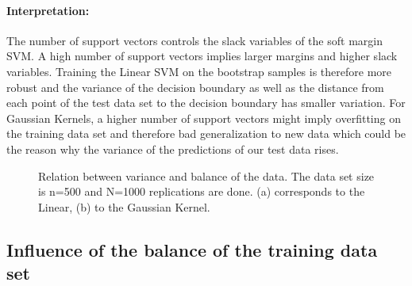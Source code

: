 \documentclass[a4paper]{article}
\begin{document}
\paragraph{Interpretation:}
The number of support vectors controls the slack variables of the soft margin SVM. A high number of support vectors implies larger margins and higher slack variables. Training the Linear SVM on the bootstrap samples is therefore more robust and the variance of the decision boundary as well as the distance from each point of the test data set to the decision boundary has smaller variation.
For Gaussian Kernels, a higher number of support vectors might imply overfitting on the training data set and therefore bad generalization to new data which could be the reason why the variance of the predictions of our test data rises.

\begin{figure}[!htb]
\begin{center}

\caption{Relation between variance and balance of the data. The data set size is n=500 and N=1000 replications are done. (a) corresponds to the Linear, (b) to the Gaussian Kernel.}
\label{fig5}
\end{center}
\end{figure}


\subsection{Influence of the balance of the training data set}
\end{document}
